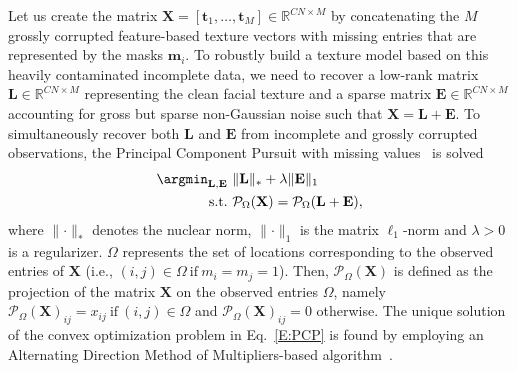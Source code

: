 Let us create the matrix
$\mathbf{X}=\left[\mathbf{t}_1, \ldots, \mathbf{t}_M\right]\in\mathbb{R}^{CN \times M}$
by concatenating the $M$ grossly corrupted feature-based texture vectors with missing entries that are represented by the masks $\mathbf{m}_i$.
To robustly build a texture model based on this heavily contaminated incomplete
data, we need to recover a low-rank matrix $\mathbf{L}\in\mathbb{R}^{CN \times M}$
representing the clean facial texture and a sparse matrix $\mathbf{E}\in\mathbb{R}^{CN \times M}$
accounting for gross but sparse non-Gaussian noise such that $\mathbf{X}=\mathbf{L}+\mathbf{E}$.
To simultaneously recover both $\mathbf{L}$ and $\mathbf{E}$ from incomplete and
grossly corrupted observations, the Principal Component Pursuit with missing
values~\cite{shang2014robust} is solved
%
\begin{equation}
\begin{aligned}
\argmin_{\mathbf{L},\mathbf{E}} &~\lVert\mathbf{L}\rVert_* + \lambda \lVert\mathbf{E}\rVert_1\\
\mbox{s.t.} &~\mathcal{P}_{\Omega}( \mathbf{X}) = \mathcal{P}_{\Omega}( \mathbf{L} +  \mathbf{E}),
\label{E:PCP}
\end{aligned}
\end{equation}
%
where $\lVert\cdot\rVert_*$ denotes the nuclear norm,
$\lVert\cdot\rVert_1$ is the matrix $\ell_1$-norm and $\lambda>0$ is a regularizer.
$\Omega$ represents the set of locations corresponding to the observed entries
of $\mathbf{X}$ (i.e., $(i,j)\in\Omega~\text{if}~m_i=m_j=1$). Then,
$\mathcal{P}_{\Omega}(\mathbf{X})$ is defined as the projection of the matrix
$\mathbf{X}$ on the observed entries $\Omega$, namely
${\mathcal{P}_{\Omega}(\mathbf{X})}_{ij} = x_{ij}~\text{if}~(i,j)\in\Omega$
and ${\mathcal{P}_{\Omega}(\mathbf{X})}_{ij}=0$ otherwise.
The unique solution of the convex optimization problem in Eq.~\ref{E:PCP} is found by employing an Alternating Direction Method of Multipliers-based algorithm~\cite{bertsekas2014constrained}.

